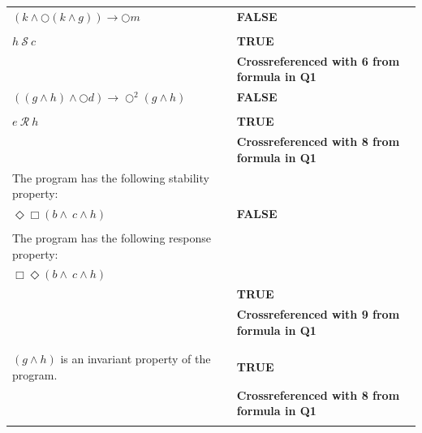 \documentclass[12pt]{article}
\begin{document}
\begin{enumerate}
\begin{table}
\begin{tabular}{|l|l|}
&\\

\hline
		
$(k \wedge \bigcirc (k \wedge g)) \rightarrow \bigcirc m$  & \textbf{FALSE}\\

&\\

\hline

		
$ h ~\mathcal{S}~ c$								
&\textbf{TRUE }\\
&\textbf{Crossreferenced with 6 from formula in Q1 }\\


\hline

		
$ ((g \wedge h) \wedge \bigcirc d) \rightarrow \bigcirc^{2} (g \wedge h)$  & \textbf{FALSE}\\

&\\

\hline

		
$e ~\mathcal{R}~ h$						
&\textbf{TRUE }\\
&\textbf{Crossreferenced with 8 from formula in Q1 }\\

\hline

		
The program has the following stability property: &\\
$\Diamond \Box (b \wedge \ c \wedge h)$		
 & \textbf{FALSE}\\


\hline

&\\
		
The program has the following response property: &\\
$\Box \Diamond (b \wedge \ c \wedge h)$		 &\\
&\textbf{TRUE }\\
&\textbf{Crossreferenced with 9 from formula in Q1 }\\
&\\

\hline

&\\
		
$( g \wedge h)$ is an invariant property of the program.  

&\textbf{TRUE }\\
&\textbf{Crossreferenced with 8 from formula in Q1 }\\
\hline

&\\
		

\end{tabular}
\end{table}
\end{enumerate}
\end{document}
